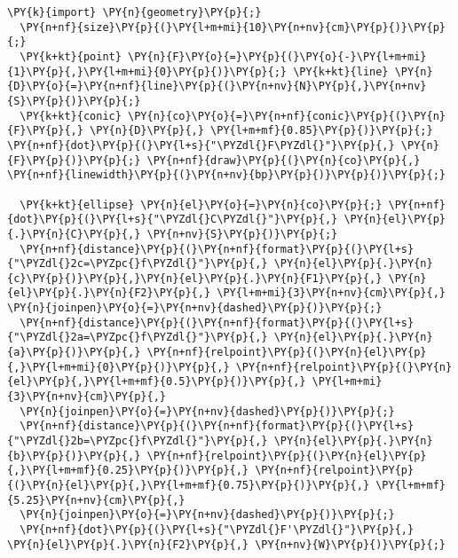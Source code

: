 \begin{Verbatim}[commandchars=\\\{\}]
  \PY{k}{import} \PY{n}{geometry}\PY{p}{;}
  \PY{n+nf}{size}\PY{p}{(}\PY{l+m+mi}{10}\PY{n+nv}{cm}\PY{p}{)}\PY{p}{;}
  \PY{k+kt}{point} \PY{n}{F}\PY{o}{=}\PY{p}{(}\PY{o}{-}\PY{l+m+mi}{1}\PY{p}{,}\PY{l+m+mi}{0}\PY{p}{)}\PY{p}{;} \PY{k+kt}{line} \PY{n}{D}\PY{o}{=}\PY{n+nf}{line}\PY{p}{(}\PY{n+nv}{N}\PY{p}{,}\PY{n+nv}{S}\PY{p}{)}\PY{p}{;}
  \PY{k+kt}{conic} \PY{n}{co}\PY{o}{=}\PY{n+nf}{conic}\PY{p}{(}\PY{n}{F}\PY{p}{,} \PY{n}{D}\PY{p}{,} \PY{l+m+mf}{0.85}\PY{p}{)}\PY{p}{;} \PY{n+nf}{dot}\PY{p}{(}\PY{l+s}{"\PYZdl{}F\PYZdl{}"}\PY{p}{,} \PY{n}{F}\PY{p}{)}\PY{p}{;} \PY{n+nf}{draw}\PY{p}{(}\PY{n}{co}\PY{p}{,} \PY{n+nf}{linewidth}\PY{p}{(}\PY{n+nv}{bp}\PY{p}{)}\PY{p}{)}\PY{p}{;}

  \PY{k+kt}{ellipse} \PY{n}{el}\PY{o}{=}\PY{n}{co}\PY{p}{;} \PY{n+nf}{dot}\PY{p}{(}\PY{l+s}{"\PYZdl{}C\PYZdl{}"}\PY{p}{,} \PY{n}{el}\PY{p}{.}\PY{n}{C}\PY{p}{,} \PY{n+nv}{S}\PY{p}{)}\PY{p}{;}
  \PY{n+nf}{distance}\PY{p}{(}\PY{n+nf}{format}\PY{p}{(}\PY{l+s}{"\PYZdl{}2c=\PYZpc{}f\PYZdl{}"}\PY{p}{,} \PY{n}{el}\PY{p}{.}\PY{n}{c}\PY{p}{)}\PY{p}{,}\PY{n}{el}\PY{p}{.}\PY{n}{F1}\PY{p}{,} \PY{n}{el}\PY{p}{.}\PY{n}{F2}\PY{p}{,} \PY{l+m+mi}{3}\PY{n+nv}{cm}\PY{p}{,} \PY{n}{joinpen}\PY{o}{=}\PY{n+nv}{dashed}\PY{p}{)}\PY{p}{;}
  \PY{n+nf}{distance}\PY{p}{(}\PY{n+nf}{format}\PY{p}{(}\PY{l+s}{"\PYZdl{}2a=\PYZpc{}f\PYZdl{}"}\PY{p}{,} \PY{n}{el}\PY{p}{.}\PY{n}{a}\PY{p}{)}\PY{p}{,} \PY{n+nf}{relpoint}\PY{p}{(}\PY{n}{el}\PY{p}{,}\PY{l+m+mi}{0}\PY{p}{)}\PY{p}{,} \PY{n+nf}{relpoint}\PY{p}{(}\PY{n}{el}\PY{p}{,}\PY{l+m+mf}{0.5}\PY{p}{)}\PY{p}{,} \PY{l+m+mi}{3}\PY{n+nv}{cm}\PY{p}{,}
  \PY{n}{joinpen}\PY{o}{=}\PY{n+nv}{dashed}\PY{p}{)}\PY{p}{;}
  \PY{n+nf}{distance}\PY{p}{(}\PY{n+nf}{format}\PY{p}{(}\PY{l+s}{"\PYZdl{}2b=\PYZpc{}f\PYZdl{}"}\PY{p}{,} \PY{n}{el}\PY{p}{.}\PY{n}{b}\PY{p}{)}\PY{p}{,} \PY{n+nf}{relpoint}\PY{p}{(}\PY{n}{el}\PY{p}{,}\PY{l+m+mf}{0.25}\PY{p}{)}\PY{p}{,} \PY{n+nf}{relpoint}\PY{p}{(}\PY{n}{el}\PY{p}{,}\PY{l+m+mf}{0.75}\PY{p}{)}\PY{p}{,} \PY{l+m+mf}{5.25}\PY{n+nv}{cm}\PY{p}{,}
  \PY{n}{joinpen}\PY{o}{=}\PY{n+nv}{dashed}\PY{p}{)}\PY{p}{;}
  \PY{n+nf}{dot}\PY{p}{(}\PY{l+s}{"\PYZdl{}F'\PYZdl{}"}\PY{p}{,} \PY{n}{el}\PY{p}{.}\PY{n}{F2}\PY{p}{,} \PY{n+nv}{W}\PY{p}{)}\PY{p}{;}
\end{Verbatim}
